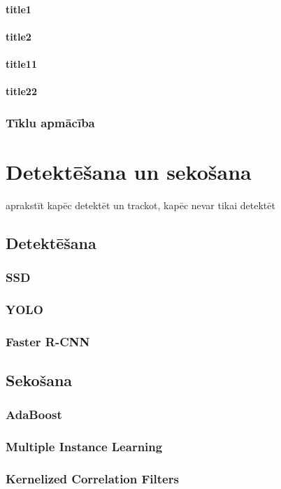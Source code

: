 \documentclass[12pt,paper=a4]{report}
\begin{document}
\subsubsection{title1}
\subsubsection{title2}
\subsubsection{title11}
\subsubsection{title22}
\subsection{Tīklu apmācība}

\chapter{Detektēšana un sekošana}
aprakstīt kapēc detektēt un trackot, kapēc nevar tikai detektēt
\section{Detektēšana}
\subsection{SSD}
\subsection{YOLO}
\subsection{Faster R-CNN}
\section{Sekošana}
\subsection{AdaBoost}
\subsection{Multiple Instance Learning}
\subsection{Kernelized Correlation Filters}
\end{document}
